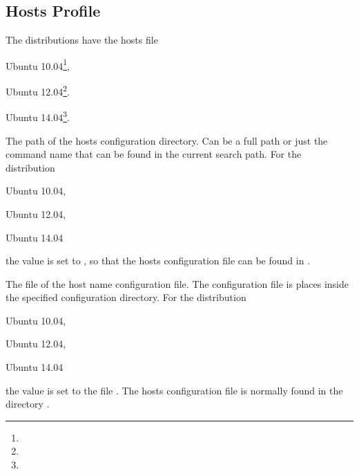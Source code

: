 \subsection{Hosts Profile}

The distributions have the hosts file
\begin{compactitem}
\item[\TheDistribution{ubuntu}] Ubuntu 10.04\footnote{\TheUbuntuMaverickLTSDate},
\item[\TheDistribution{ubuntu}] Ubuntu 12.04\footnote{\TheUbuntuPreciseLTSDate}.
\item[\TheDistribution{ubuntu}] Ubuntu 14.04\footnote{\TheUbuntuTrustyLTSDate}.
\end{compactitem}


The path of the hosts configuration directory. Can be a full path or
just the command name that can be found in the current search path.
For the distribution
\begin{inparaitem}
\item[\TheDistribution{ubuntu}] Ubuntu 10.04,
\item[\TheDistribution{ubuntu}] Ubuntu 12.04,
\item[\TheDistribution{ubuntu}] Ubuntu 14.04
\end{inparaitem}
the value is set to , so that the hosts configuration
file can be found in .


The file  of the host name configuration file. The configuration file
is places inside the specified configuration directory.
For the distribution
\begin{inparaitem}
\item[\TheDistribution{ubuntu}] Ubuntu 10.04,
\item[\TheDistribution{ubuntu}] Ubuntu 12.04,
\item[\TheDistribution{ubuntu}] Ubuntu 14.04
\end{inparaitem}
the value is set to the file . The hosts configuration
file is normally found in the directory .

